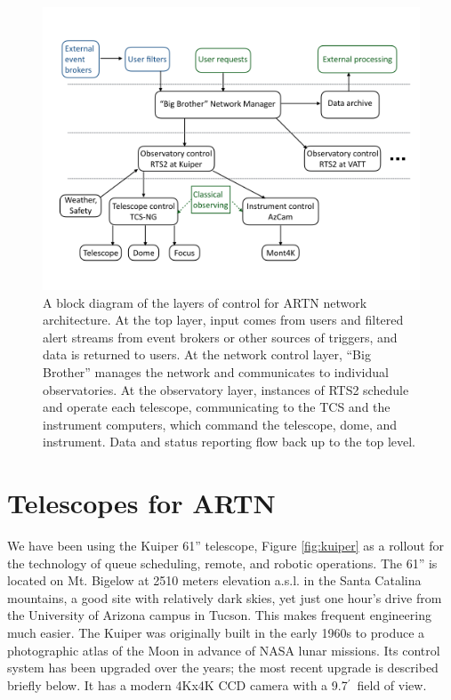 \documentclass[]{spie}  %
\def\arcmin{$^{\prime}$}
\begin{document}
 \begin{figure} [ht]
   \begin{center}
   \includegraphics[width=15cm]{layer_block_diagram.png}
  \end{center}
   \caption[] 
   { \label{fig:layers} 
A block diagram of the layers of control for ARTN network architecture. At the top layer, input comes from users and filtered alert streams from event brokers or other sources of triggers, and data is returned to users. At the network control layer, ``Big Brother'' manages the network and communicates to individual observatories. At the observatory layer, instances of RTS2 schedule and operate each telescope, communicating to the TCS and the instrument computers, which command the telescope, dome, and instrument.  Data and status reporting flow back up to the top level.
}
  \end{figure} 


\section{Telescopes for ARTN}

We have been using the Kuiper 61'' telescope, Figure \ref{fig:kuiper} as a rollout for the technology of queue scheduling, remote, and robotic operations.  The 61'' is located 
on Mt. Bigelow at 2510 meters elevation a.s.l. in the Santa Catalina mountains, a good site with relatively dark skies, yet just one hour's drive from the University of Arizona campus in Tucson. This makes frequent engineering much easier.  The Kuiper was originally built in the early 1960s to produce a photographic atlas of the Moon in advance of NASA lunar missions. Its control system has been upgraded over the years; the most recent upgrade is described briefly below. It has a modern 4Kx4K CCD camera with a 9.7\arcmin\ field of view. 
\end{document}
